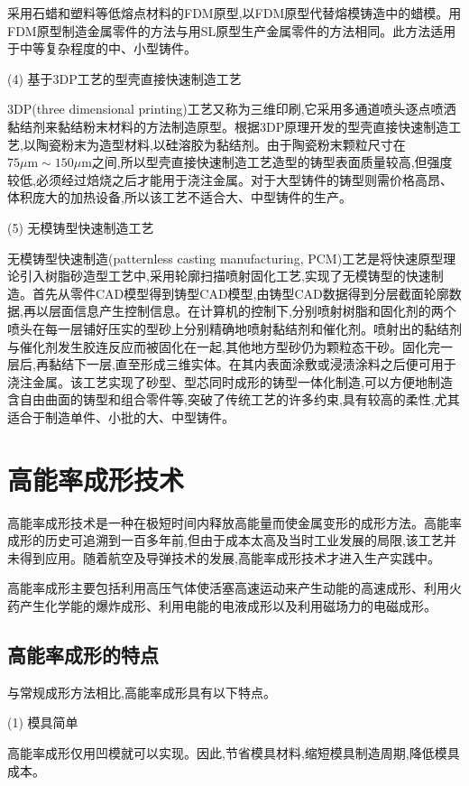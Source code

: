 \documentclass[UTF8]{ctexbook}
\newcommand{\◎}{\ensuremath{\bigcirc}}
\begin{document}
采用石蜡和塑料等低熔点材料的FDM原型,以FDM原型代替熔模铸造中的蜡模。用FDM原型制造金属零件的方法与用SL原型生产金属零件的方法相同。此方法适用于中等复杂程度的中、小型铸件。

(4) 基于3DP工艺的型壳直接快速制造工艺

3DP(three dimensional printing)工艺又称为三维印刷,它采用多通道喷头逐点喷洒黏结剂来黏结粉末材料的方法制造原型。根据3DP原理开发的型壳直接快速制造工艺,以陶瓷粉末为造型材料,以硅溶胶为黏结剂。由于陶瓷粉末颗粒尺寸在$75 \mu \mathrm{m} \sim 150 \mu \mathrm{m}$之间,所以型壳直接快速制造工艺造型的铸型表面质量较高,但强度较低,必须经过焙烧之后才能用于浇注金属。对于大型铸件的铸型则需价格高昂、体积庞大的加热设备,所以该工艺不适合大、中型铸件的生产。

(5) 无模铸型快速制造工艺

无模铸型快速制造(patternless casting manufacturing, PCM)工艺是将快速原型理论引入树脂砂造型工艺中,采用轮廓扫描喷射固化工艺,实现了无模铸型的快速制造。首先从零件CAD模型得到铸型CAD模型,由铸型CAD数据得到分层截面轮廓数据,再以层面信息产生控制信息。在计算机的控制下,分别喷射树脂和固化剂的两个喷头在每一层铺好压实的型砂上分别精确地喷射黏结剂和催化剂。喷射出的黏结剂与催化剂发生胶连反应而被固化在一起,其他地方型砂仍为颗粒态干砂。固化完一层后,再黏结下一层,直至形成三维实体。在其内表面涂敷或浸渍涂料之后便可用于浇注金属。该工艺实现了砂型、型芯同时成形的铸型一体化制造,可以方便地制造含自由曲面的铸型和组合零件等,突破了传统工艺的许多约束,具有较高的柔性,尤其适合于制造单件、小批的大、中型铸件。

\section{高能率成形技术}
高能率成形技术是一种在极短时间内释放高能量而使金属变形的成形方法。高能率成形的历史可追溯到一百多年前,但由于成本太高及当时工业发展的局限,该工艺并未得到应用。随着航空及导弹技术的发展,高能率成形技术才进入生产实践中。

高能率成形主要包括利用高压气体使活塞高速运动来产生动能的高速成形、利用火药产生化学能的爆炸成形、利用电能的电液成形以及利用磁场力的电磁成形。

\subsection{高能率成形的特点}
与常规成形方法相比,高能率成形具有以下特点。

(1) 模具简单

高能率成形仅用凹模就可以实现。因此,节省模具材料,缩短模具制造周期,降低模具成本。
\end{document}
